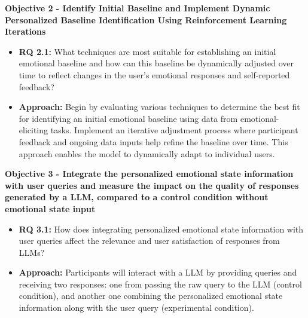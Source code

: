 \textbf{Objective 2 - Identify Initial Baseline and Implement Dynamic Personalized Baseline Identification Using Reinforcement Learning Iterations}
\label{obj:2}
\begin{itemize}
    \item \textbf{RQ 2.1:}\label{rq:2.1} What techniques are most suitable for establishing an initial emotional baseline and how can this baseline be dynamically adjusted over time to reflect changes in the user's emotional responses and self-reported feedback?
    
    \item \textbf{Approach:} Begin by evaluating various techniques to determine the best fit for identifying an initial emotional baseline using data from emotional-eliciting tasks. Implement an iterative adjustment process where participant feedback and ongoing data inputs help refine the baseline over time. This approach enables the model to dynamically adapt to individual users.
\end{itemize}


\textbf{Objective 3 - Integrate the personalized emotional state information with user queries and measure the impact on the quality of responses generated by a LLM, compared to a control condition without emotional state input}
\label{obj:3}
\begin{itemize}
    \item \textbf{RQ 3.1:}\label{rq:3.1} How does integrating personalized emotional state information with user queries affect the relevance and user satisfaction of responses from LLMs?
    
    \item \textbf{Approach:} Participants will interact with a LLM by providing queries and receiving two responses: one from passing the raw query to the LLM (control condition), and another one combining the personalized emotional state information along with the user query (experimental condition).
\end{itemize}